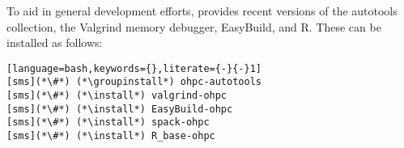 To aid in general development efforts, \OHPC{} provides recent versions of the \GNU{}
autotools collection, the Valgrind memory debugger, EasyBuild, and R. These can be installed as follows:

\begin{lstlisting}[language=bash,keywords={},literate={-}{-}1]
[sms](*\#*) (*\groupinstall*) ohpc-autotools
[sms](*\#*) (*\install*) valgrind-ohpc
[sms](*\#*) (*\install*) EasyBuild-ohpc
[sms](*\#*) (*\install*) spack-ohpc
[sms](*\#*) (*\install*) R_base-ohpc            
\end{lstlisting}
